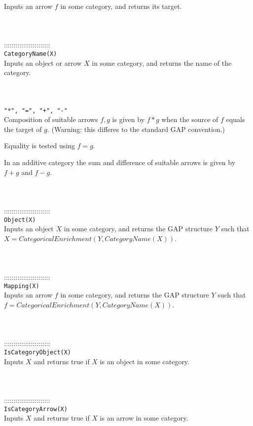 \documentclass[a4paper,11pt]{report}
\begin{document}
{ Inputs an arrow $f$ in some category, and returns its target. \\
 \\
 \\
 \\
 ::::::::::::::::::::::::\\
 \texttt{CategoryName(X) }\\
 

 Inputs an object or arrow $X$ in some category, and returns the name of the category. \\
 \\
 \\
 \\
 \texttt{"*", "=", "+", "-" }\\
 

 Composition of suitable arrows $f,g$ is given by $f*g$ when the source of $f$ equals the target of $g$. (Warning: this differes to the standard GAP convention.) 

 Equality is tested using $f=g$. 

In an additive category the sum and difference of suitable arrows is given by $f+g$ and $f-g$. \\
 \\
 \\
 \\
 ::::::::::::::::::::::::\\
 \texttt{Object(X) }\\
 

 Inputs an object $X$ in some category, and returns the GAP structure $Y$ such that $X=CategoricalEnrichment(Y,CategoryName(X))$. \\
 \\
 \\
 \\
 ::::::::::::::::::::::::\\
 \texttt{Mapping(X) }\\
 

 Inputs an arrow $f$ in some category, and returns the GAP structure $Y$ such that $f=CategoricalEnrichment(Y,CategoryName(X))$. \\
 \\
 \\
 \\
 ::::::::::::::::::::::::\\
 \texttt{IsCategoryObject(X) }\\
 

 Inputs $X$ and returns true if $X$ is an object in some category. \\
 \\
 \\
 \\
 ::::::::::::::::::::::::\\
 \texttt{IsCategoryArrow(X) }\\
 

 Inputs $X$ and returns true if $X$ is an arrow in some category. \\
 \\
 \\
 }
\end{document}
